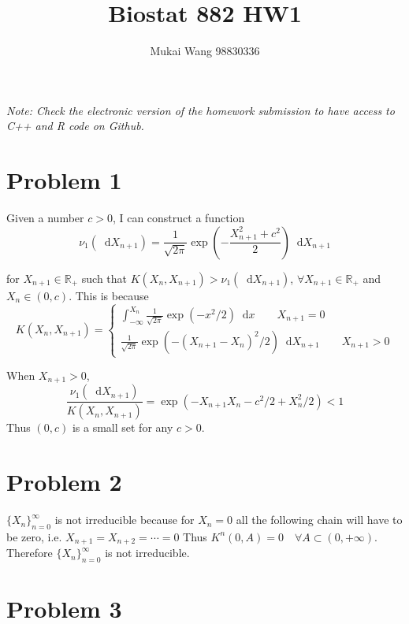 \documentclass[12pt]{article}
\title{Biostat 882 HW1}
\date{}
\author{Mukai Wang 98830336}
\newcommand*\diff{\mathop{}\!\mathrm{d}}
\begin{document}
\maketitle


\emph{Note: Check the electronic version of the homework submission to have access to C++ and R code on Github.}

\section*{Problem 1}

Given a number $c>0$, I can construct a function
\[\nu_1(\diff X_{n+1}) = \frac{1}{\sqrt{2\pi}} \exp (-\frac{X_{n+1}^2+c^2}{2})\diff X_{n+1} \]

for $X_{n+1} \in  \mathbb{R}_+$ such that $K(X_n, X_{n+1}) > \nu_1(\diff X_{n+1})$,
 $\forall X_{n+1} \in \mathbb{R}_{+}$ and $X_n \in (0, c)$. This is because
 $$K(X_n, X_{n+1}) = \begin{cases}
 	\int_{-\infty}^{X_n}\frac{1}{\sqrt{2\pi}} \exp(-x^2 /2)\diff x \qquad X_{n+1} = 0\\
 	\frac{1}{\sqrt{2\pi}} \exp(-(X_{n+1}-X_n)^2/2)\diff X_{n+1}\qquad X_{n+1} > 0
 \end{cases}
  $$
  
  When $X_{n+1} > 0$, 
  \[ \frac{\nu_1(\diff X_{n+1})}{K(X_n, X_{n+1})} = \exp(-X_{n+1}X_n - c^2/2 + X_{n}^2/2) < 1\]
  Thus $(0, c)$ is a small set for any $c>0$.
\section*{Problem 2}
 $\{X_n \}_{n=0}^{\infty}$ is not irreducible because for $X_n=0$ all the following chain will have to be zero, i.e. $X_{n+1} = X_{n+2} =\cdots =0$
 Thus $K^n (0, A) = 0 \quad \forall A\subset (0, +\infty)$. Therefore $\{X_n \}_{n=0}^{\infty}$ is not irreducible.

\section*{Problem 3}
\end{document}
